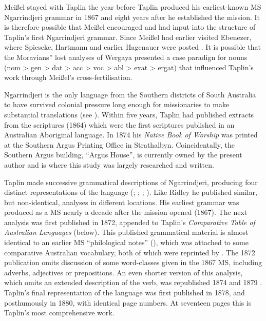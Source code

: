 Meißel stayed with Taplin the year before Taplin produced his earliest-known MS Ngarrindjeri grammar in 1867 and eight years after he established the mission. It is therefore possible that Meißel encouraged and had input into the structure of Taplin’s first Ngarrindjeri grammar. Since Meißel had earlier visited Ebenezer, where Spieseke, Hartmann and earlier Hagenauer were posted \citep[109--112]{edwards_moravian_2007}. It is possible that the Moravians” lost analyses of Wergaya presented a case paradign for nouns (nom > gen > dat > acc > voc > abl > exat > ergat) that influenced Taplin’s work through Meißel’s cross-fertilisation.

Ngarrindjeri is the only language from the Southern districts of South Australia to have survived colonial pressure long enough for missionaries to make substantial translations (see \citealt[122--123]{simpson_i_2008}). Within five years, Taplin had published extracts from the scriptures (1864) which were the first scriptures published in an Australian Aboriginal language. In {1874} his \textit{Native Book of Worship} was printed at the Southern Argus Printing Office in Strathalbyn. Coincidentally, the Southern Argus building, ``Argus House'', is currently owned by the present author and is where this study was largely researched and written.



\largerpage[-1]
Taplin made successive grammatical descriptions of Ngarrindjeri, producing four distinct representations of the language (\citeyear{taplin_vocabulary_1867}; \citeyear{taplin_notes_1872}; \citeyear{taplin_native_1874}; \citeyear{taplin_grammar_1878}). Like Ridley he published similar, but non-identical, analyses in different locations. His earliest grammar was produced as a MS nearly a decade after the mission opened (1867). The next analysis was first published in 1872, appended to Taplin’s \textit{Comparative Table of Australian Languages} (below). This published grammatical material is almost identical to an earlier MS “philological notes” (\citeyear{taplin_notes_1870}), which was attached to some comparative Australian vocabulary, both of which were reprinted by \citet[132--144]{grimwade_george_1975}. The {1872} publication omits discussion of some word-classes given in the 1867 MS, including adverbs, adjectives or prepositions. An even shorter version of this analysis, which omits an extended description of the verb, was republished 1874 \citep{taplin_narrinyeri_1874} and 1879 \citep{taplin_narrinyeri_1879}. Taplin’s final representation of the language was first published in 1878, and posthumously in 1880, with identical page numbers. At seventeen pages this is Taplin’s most comprehensive work.

